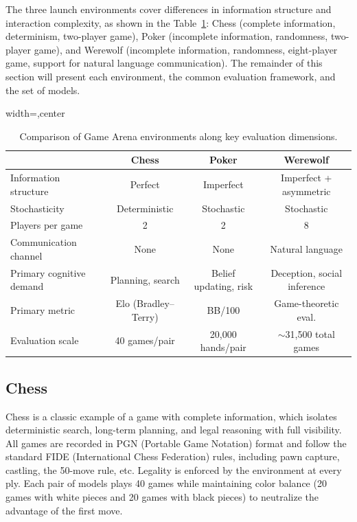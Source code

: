 \documentclass{article}
\begin{document}
The three launch environments cover differences in information structure and interaction complexity, as shown in the Table~\ref{tab:env_comparison}: Chess (complete information, determinism, two-player game), Poker (incomplete information, randomness, two-player game), and Werewolf (incomplete information, randomness, eight-player game, support for natural language communication). The remainder of this section will present each environment, the common evaluation framework, and the set of models.

\begin{table}[t]
\centering
\caption{Comparison of Game Arena environments along key evaluation dimensions.}
\label{tab:env_comparison}
\begin{adjustbox}{width=\linewidth,center} %
\begin{tabular}{lccc}
\toprule
& \textbf{Chess} & \textbf{Poker} & \textbf{Werewolf} \\
\midrule
Information structure & Perfect & Imperfect & Imperfect + asymmetric \\
Stochasticity & Deterministic & Stochastic & Stochastic \\
Players per game & 2 & 2 & 8 \\
Communication channel & None & None & Natural language \\
Primary cognitive demand & Planning, search & Belief updating, risk & Deception, social inference \\
Primary metric & Elo (Bradley--Terry) & BB/100 & Game-theoretic eval. \\
Evaluation scale & 40 games/pair & 20{,}000 hands/pair & $\sim$31{,}500 total games \\
\bottomrule
\end{tabular}
\end{adjustbox}
\end{table}




\subsection{Chess}
\label{sec:chess_methods}

Chess is a classic example of a game with complete information, which isolates deterministic search, long-term planning, and legal reasoning with full visibility. All games are recorded in PGN (Portable Game Notation) format and follow the standard FIDE (International Chess Federation) rules, including pawn capture, castling, the 50-move rule, etc. Legality is enforced by the environment at every ply. Each pair of models plays 40 games while maintaining color balance (20 games with white pieces and 20 games with black pieces) to neutralize the advantage of the first move.
\end{document}
